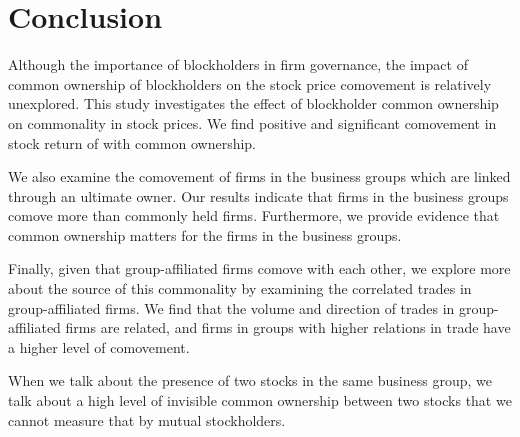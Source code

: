 \section{Conclusion}

Although the importance of blockholders in firm governance, the impact of common ownership of blockholders on the stock price comovement is relatively unexplored. This study investigates the effect of blockholder common ownership on commonality in stock prices. We find positive and significant comovement in stock return of with common ownership.

 We also examine the comovement of firms in the business groups which are linked through an ultimate owner. Our results indicate that firms in the business groups comove more than commonly held firms. Furthermore, we provide evidence that common ownership matters for the firms in the business groups. 

Finally, given that group-affiliated firms comove with each other,  we explore more about the source of this commonality by examining the correlated trades in group-affiliated firms. We find that the volume and direction of trades in group-affiliated firms are related, and firms in groups with higher relations in trade have a higher level of comovement.


When we talk about the presence of two stocks in the same business group, we talk about a high level of invisible common ownership between two stocks that we cannot measure that by mutual stockholders.

	


\newpage
	{
	\footnotesize
		
		
	}





